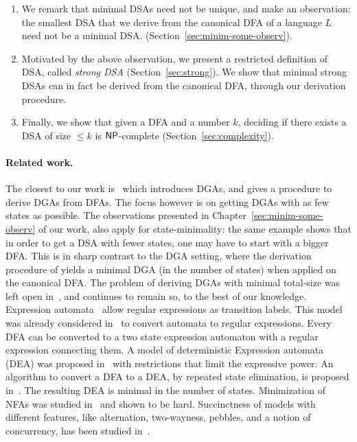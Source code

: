 \begin{enumerate}
\item We remark that minimal DSAs need not be unique, and make an
  observation: the smallest DSA that we derive from the
  canonical DFA of a language $L$ need not be a minimal DSA. 
  (Section~\ref{sec:minim-some-observ}).

\item Motivated by the above observation, we present a restricted definition of DSA, called \emph{strong DSA} (Section~\ref{sec:strong}). We show that minimal strong DSAs can in fact be derived from the canonical DFA, through our derivation procedure. 


\item Finally, we show that given a DFA and a number $k$, deciding if
  there exists a DSA of size $\le k$ is $\mathsf{NP}$-complete
  (Section~\ref{sec:complexity}).

\end{enumerate}

\paragraph*{Related work.} The closest to our work
is~\cite{giammarresi1999deterministic} which introduces DGAs, and
gives a procedure to derive DGAs from DFAs. The focus however is on
getting DGAs with as few states as possible. The observations presented in
Chapter~\ref{sec:minim-some-observ} of our work, also apply for
state-minimality: the same example shows that in order to get a DSA with fewer
states, one may have to start with a bigger DFA.  This is in sharp
contrast to the DGA setting, where the derivation procedure of
\cite{giammarresi1999deterministic} yields a minimal DGA (in the
number of states) when applied on the canonical DFA. The problem of
deriving DGAs with minimal total-size was left open
in~\cite{giammarresi1999deterministic}, and continues to remain so, to
the best of our knowledge.
Expression automata~\cite{DBLP:conf/wia/HanW04} allow regular
expressions as transition labels.  This model was already considered
in~\cite{DBLP:journals/tc/BrzozowskiM63} to convert automata to
regular expressions. Every DFA can be converted to a two state
expression automaton with a regular expression connecting them.  A
model of deterministic Expression automata (DEA) was proposed
in~\cite{DBLP:conf/wia/HanW04} with restrictions that limit the
expressive power.  An algorithm to convert a DFA to a DEA, by repeated
state elimination, is proposed in~\cite{DBLP:conf/wia/HanW04}. The
resulting DEA is minimal in the number of states.  
Minimization of NFAs was studied
in~\cite{DBLP:journals/siamcomp/JiangR93} and shown to be
hard. Succinctness of models with different features, like alternation,
two-wayness, pebbles, and a notion of concurrency, has been studied
in~\cite{DBLP:journals/tcs/GlobermanH96}.


